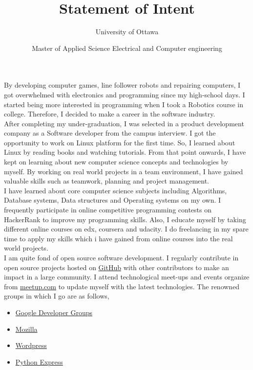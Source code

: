 \documentclass{article}
\title{Statement of Intent}
\author{University of Ottawa}\date{Master of Applied Science Electrical and Computer engineering}
\begin{document}
  \maketitle %

By developing computer games, line follower robots and repairing computers, I got overwhelmed with electronics and programming since my high-school days. I started being more interested in programming when I took a Robotics course in college. Therefore, I decided to make a career in the software industry.\\

After completing my under-graduation, I was selected in a product development company as a Software developer from the campus interview. I got the opportunity to work on Linux platform for the first time. So, I learned about Linux by reading books and watching tutorials. From that point onwards, I have kept on learning about new computer science concepts and technologies by myself. By working on real world projects in a team environment, I have gained valuable skills such as teamwork, planning and project management.\\

I have learned about core computer science subjects including Algorithms, Database systems, Data structures and Operating systems on my own. I frequently participate in online competitive programming contests on HackerRank to improve my programming skills. Also, I educate myself by taking different online courses on edx, coursera and udacity. I do freelancing in my spare time to apply my skills which i have gained from online courses into the real world projects.\\

I am quite fond of open source software development. I regularly contribute in open source projects hosted on \href{http://www.GitHub.com/mehul-m-prajapati}{GitHub} with other contributors to make an impact in a large community. I attend technological meet-ups and events organize from \href{www.meetup.com}{meetup.com} to update myself with the latest technologies. The renowned groups in which I go are as follows,

\begin{itemize}
   \item \href{https://developers.google.com/groups/chapter/106261089114347152720/}{Google Developer Groups}
   
   \item \href{http://mozillaindia.org/}{Mozilla} 
   
   \item \href{https://www.meetup.com/ahmedabad-wp-meetup/members/72560962/}{Wordpress}
   
   \item \href{https://pythonexpress.in/}{Python Express}
\end{itemize}
\end{document}
